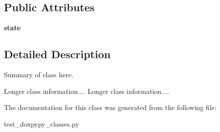 \subsection*{Public Attributes}
\begin{DoxyCompactItemize}
\item 
\hypertarget{classtest__doxpypy__classes_1_1Staterobot_a17a3d4a6919c1364f25abc9c1bea3f0f}{{\bfseries state}}\label{classtest__doxpypy__classes_1_1Staterobot_a17a3d4a6919c1364f25abc9c1bea3f0f}

\end{DoxyCompactItemize}


\subsection{Detailed Description}
\begin{DoxyVerb}Summary of class here.

Longer class information....
Longer class information....
\end{DoxyVerb}
 

The documentation for this class was generated from the following file\+:\begin{DoxyCompactItemize}
\item 
test\+\_\+doxpypy\+\_\+classes.\+py\end{DoxyCompactItemize}
